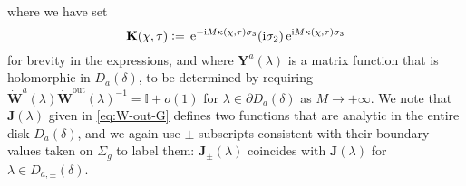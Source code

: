 where we have set
\begin{equation}
\mathbf{K}(\chi,\tau) \vcentcolon=   \,\mathrm{e}^{-\mathrm{i} M\kappa(\chi,\tau)\sigma_3}(\mathrm{i} \sigma_2)  \,\mathrm{e}^{\mathrm{i} M \kappa(\chi,\tau)\sigma_3}
\label{eq:K-mat}
\end{equation}
for brevity in the expressions, and where $\mathbf{Y}^a(\lambda)$ is a matrix function that is holomorphic in $D_a(\delta)$, to be determined by requiring $\dot{\mathbf{W}}^{a}(\lambda)\dot{\mathbf{W}}^{\mathrm{out}}(\lambda)^{-1}=\mathbb{I}+o(1)$ for $\lambda\in \partial D_a(\delta)$ as $M\to+\infty$.
We note that $\mathbf{J}(\lambda)$ given in \eqref{eq:W-out-G} defines two functions that are analytic in the entire disk $D_a(\delta)$, and we again use $\pm$ subscripts consistent with their boundary values taken on $\Sigma_g$ to label them:
$\mathbf{J}_\pm(\lambda)$ coincides with $\mathbf{J}(\lambda)$ for $\lambda\in D_{a,\pm}(\delta)$.

